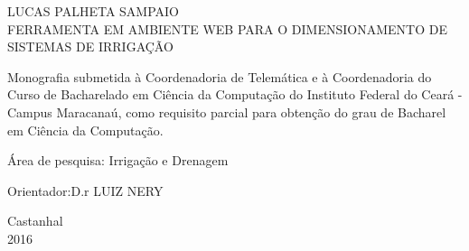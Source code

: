 \begin{titlepage}
\vfill
\begin{center}

    {\large LUCAS PALHETA SAMPAIO\\}
    \vspace{2cm}
    {\Large \textsc{FERRAMENTA EM AMBIENTE WEB PARA O DIMENSIONAMENTO DE SISTEMAS DE IRRIGAÇÃO}\\}
    \vspace{1cm}
    \hspace{.45\linewidth}
    \begin{minipage}{.50\linewidth}

            Monografia submetida à Coordenadoria de Telemática e à Coordenadoria do Curso de Bacharelado 
            em Ciência da Computação do Instituto Federal do Ceará - Campus Maracanaú, como requisito 
            parcial para obtenção do grau de Bacharel em Ciência da Computação.

            \vspace{0.5 cm}

            Área de pesquisa: Irrigação e Drenagem

            \vspace{0.5 cm}

            Orientador:D.r LUIZ NERY
    
    \end{minipage}

    \vspace{2cm}
    \vfill
    {\large Castanhal\\ 2016}
\end{center}

\end{titlepage}